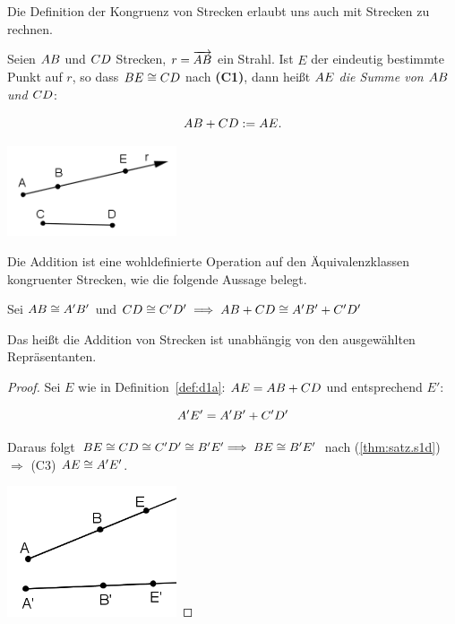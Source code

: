 Die Definition der Kongruenz von Strecken erlaubt uns auch mit Strecken zu rechnen.

\begin{defi}\label{def:d1a}
    Seien ${AB}$ und ${CD}$ Strecken, $r = \mbox{${\overrightarrow{AB}}$}$ ein Strahl. Ist $E$ der eindeutig
    bestimmte Punkt auf $r$, so dass ${BE} \cong {CD}$ nach \textbf{(C1)}, dann heißt
    ${AE}$ {\em die Summe von ${AB}$ und ${CD}$}:

    $$
        {AB} + {CD} := {AE}.
    $$
\end{defi}

\centerline{\includegraphics[width=5cm]{BILDER/1-2-02-Add.png}}

Die Addition ist eine wohldefinierte Operation auf den Äquivalenzklassen kongruenter Strecken, wie
die folgende Aussage belegt.


\begin{thm}\label{thm:satz.s1e}
    Sei ${AB} \cong {A'B'}$ und ${CD} \cong {C'D'}\; \Longrightarrow\; {AB} +
    {CD} \cong {A'B'} + {C'D'}$

    Das heißt die Addition von Strecken ist unabhängig von den ausgewählten Repräsentanten.
\end{thm}

\begin{proof}
    Sei $E$ wie in Definition~\ref{def:d1a}: ${AE} = {AB}+{CD}$ und entsprechend $E':$

    $$
        {A'E'} = {A'B'} + {C'D'}
    $$

    Daraus folgt ${BE} \cong {CD} \cong {C'D'} \cong {B'E'} \Longrightarrow\;
    {BE} \cong {B'E'}$ nach (\ref{thm:satz.s1d}) $\Longrightarrow$ (C3)
    ${AE}\cong{A'E'}$.

    \centerline{\includegraphics[width=5cm]{BILDER/1-2-03-Add.png}}
\end{proof}

